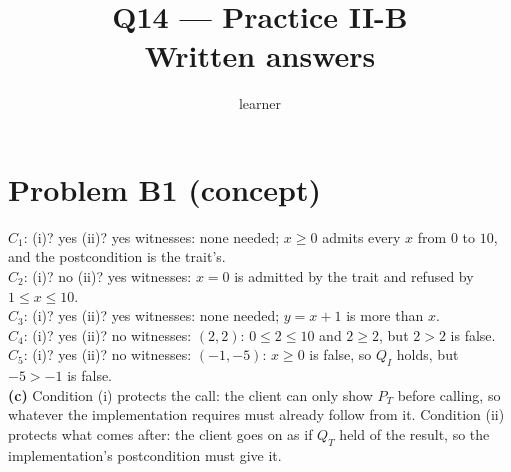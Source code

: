 \documentclass[11pt]{article}
\title{Q14 --- Practice II-B \\ \large Written answers}
\author{learner}
\date{}
\begin{document}
\maketitle
\sloppy

\section*{Problem B1 (concept)}\label{ans:B1}
\begin{answer}
$C_1$: (i)? yes \quad (ii)? yes \quad witnesses: none needed; $x \ge 0$
admits every $x$ from $0$ to $10$, and the postcondition is the trait's. \\
$C_2$: (i)? no \quad (ii)? yes \quad witnesses: $x = 0$ is admitted by the
trait and refused by $1 \le x \le 10$. \\
$C_3$: (i)? yes \quad (ii)? yes \quad witnesses: none needed; $y = x + 1$ is
more than $x$. \\
$C_4$: (i)? yes \quad (ii)? no \quad witnesses: $(2, 2)$: $0 \le 2 \le 10$
and $2 \ge 2$, but $2 > 2$ is false. \\
$C_5$: (i)? yes \quad (ii)? no \quad witnesses: $(-1, -5)$: $x \ge 0$ is
false, so $Q_I$ holds, but $-5 > -1$ is false. \\
\textbf{(c)} Condition (i) protects the call: the client can only show $P_T$
before calling, so whatever the implementation requires must already follow
from it. Condition (ii) protects what comes after: the client goes on as if
$Q_T$ held of the result, so the implementation's postcondition must give it.
\end{answer}

\end{document}
